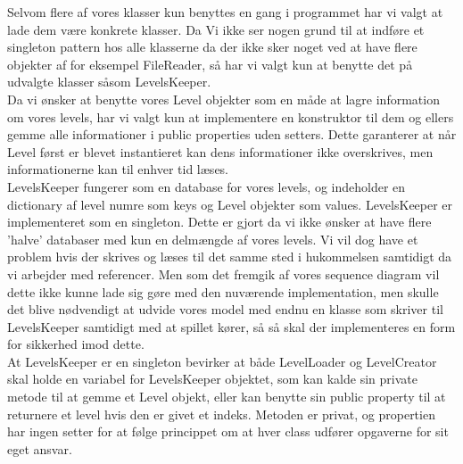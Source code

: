 Selvom flere af vores klasser kun benyttes en gang i programmet har vi valgt at lade dem være konkrete klasser. Da Vi ikke ser nogen grund til at indføre et singleton pattern hos alle klasserne da der ikke sker noget ved at have flere objekter af for eksempel FileReader, så har vi valgt kun at benytte det på udvalgte klasser såsom LevelsKeeper.\\
Da vi ønsker at benytte vores Level objekter som en måde at lagre information om vores levels, har vi valgt kun at implementere en konstruktor til dem og ellers gemme alle informationer i public properties uden setters. Dette garanterer at når Level først er blevet instantieret kan dens informationer ikke overskrives, men informationerne kan til enhver tid læses.\\
LevelsKeeper fungerer som en database for vores levels, og indeholder en dictionary af level numre som keys og Level objekter som values. LevelsKeeper er implementeret som en singleton. Dette er gjort da vi ikke ønsker at have flere 'halve' databaser med kun en delmængde af vores levels. Vi vil dog have et problem hvis der skrives og læses til det samme sted i hukommelsen samtidigt da vi arbejder med referencer. Men som det fremgik af vores sequence diagram vil dette ikke kunne lade sig gøre med den nuværende implementation, men skulle det blive nødvendigt at udvide vores model med endnu en klasse som skriver til LevelsKeeper samtidigt med at spillet kører, så så skal der implementeres en form for sikkerhed imod dette.\\
At LevelsKeeper er en singleton bevirker at både LevelLoader og LevelCreator skal holde en variabel for LevelsKeeper objektet, som kan kalde sin private metode til at gemme et Level objekt, eller kan benytte sin public property til at returnere et level hvis den er givet et indeks. Metoden er privat, og propertien har ingen setter for at følge princippet om at hver class udfører opgaverne for sit eget ansvar.\\


